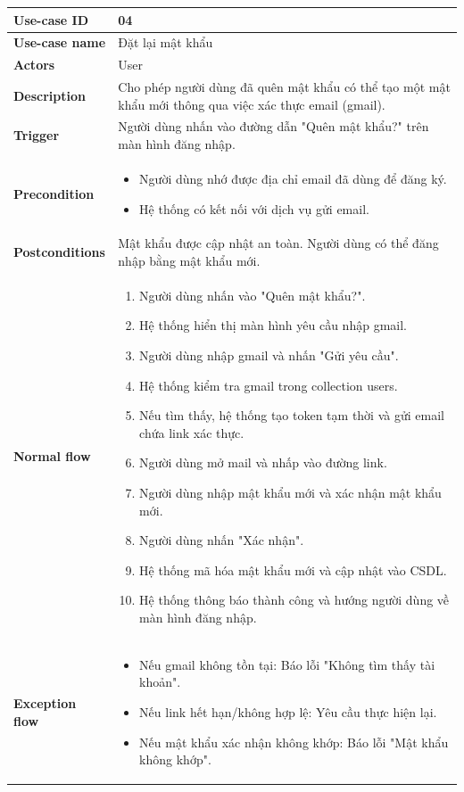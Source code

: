 \documentclass[a4paper, 12pt]{article}
\begin{document}
	\begin{longtable}{|p{3.5cm}|p{12cm}|}
		\hline
		\textbf{Use-case ID} & 04 \\
		\hline
		\textbf{Use-case name} & Đặt lại mật khẩu \\
		\hline
		\textbf{Actors} & User \\
		\hline
		\textbf{Description} & Cho phép người dùng đã quên mật khẩu có thể tạo một mật khẩu mới thông qua việc xác thực email (gmail). \\
		\hline
		\textbf{Trigger} & Người dùng nhấn vào đường dẫn "Quên mật khẩu?" trên màn hình đăng nhập. \\
		\hline
		\textbf{Precondition} & 
		\begin{itemize}[label=+]
			\item Người dùng nhớ được địa chỉ email đã dùng để đăng ký.
			\item Hệ thống có kết nối với dịch vụ gửi email.
		\end{itemize} \\
		\hline
		\textbf{Postconditions} & Mật khẩu được cập nhật an toàn. Người dùng có thể đăng nhập bằng mật khẩu mới. \\
		\hline
		\textbf{Normal flow} & 
		\begin{enumerate}
			\item Người dùng nhấn vào "Quên mật khẩu?".
			\item Hệ thống hiển thị màn hình yêu cầu nhập gmail.
			\item Người dùng nhập gmail và nhấn "Gửi yêu cầu".
			\item Hệ thống kiểm tra gmail trong collection users.
			\item Nếu tìm thấy, hệ thống tạo token tạm thời và gửi email chứa link xác thực.
			\item Người dùng mở mail và nhấp vào đường link.
			\item Người dùng nhập mật khẩu mới và xác nhận mật khẩu mới.
			\item Người dùng nhấn "Xác nhận".
			\item Hệ thống mã hóa mật khẩu mới và cập nhật vào CSDL.
			\item Hệ thống thông báo thành công và hướng người dùng về màn hình đăng nhập.
		\end{enumerate} \\
		\hline
		\textbf{Exception flow} & 
		\begin{itemize}[label={*}]
			\item Nếu gmail không tồn tại: Báo lỗi "Không tìm thấy tài khoản".
			\item Nếu link hết hạn/không hợp lệ: Yêu cầu thực hiện lại.
			\item Nếu mật khẩu xác nhận không khớp: Báo lỗi "Mật khẩu không khớp".
		\end{itemize} \\
		\hline
	\end{longtable}
	\vspace{0.5cm}
	
\end{document}

